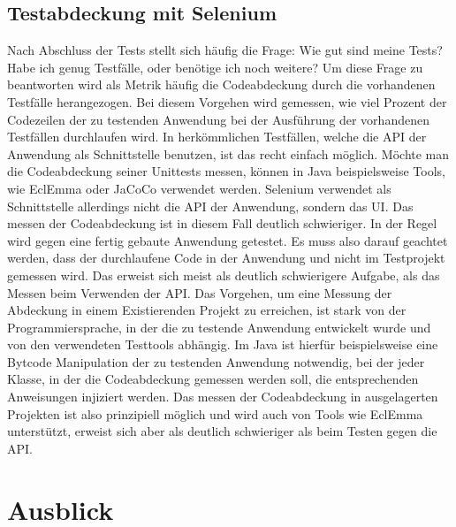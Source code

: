 \section{Testabdeckung mit Selenium}
\label{sec:testabdeckung_mit_selenium}

Nach Abschluss der Tests stellt sich häufig die Frage: Wie gut sind meine Tests? Habe ich genug Testfälle, oder benötige ich noch weitere? Um diese Frage zu beantworten wird als Metrik häufig die Codeabdeckung durch die vorhandenen Testfälle herangezogen. Bei diesem Vorgehen wird gemessen, wie viel Prozent der Codezeilen der zu testenden Anwendung bei der Ausführung der vorhandenen Testfällen durchlaufen wird.
In herkömmlichen Testfällen, welche die API der Anwendung als Schnittstelle benutzen, ist das recht einfach möglich. Möchte man die Codeabdeckung seiner Unittests messen, können in Java beispielsweise Tools, wie EclEmma oder JaCoCo verwendet werden. Selenium verwendet als Schnittstelle allerdings nicht die API der Anwendung, sondern das UI. Das messen der Codeabdeckung ist in diesem Fall deutlich schwieriger. In der Regel wird gegen eine fertig gebaute Anwendung getestet. Es muss also darauf geachtet werden, dass der durchlaufene Code in der Anwendung und nicht im Testprojekt gemessen wird.
Das erweist sich meist als deutlich schwierigere Aufgabe, als das Messen beim Verwenden der API. Das Vorgehen, um eine Messung der Abdeckung in einem Existierenden Projekt zu erreichen, ist stark von der Programmiersprache, in der die zu testende Anwendung entwickelt wurde und von den verwendeten Testtools abhängig. Im Java ist hierfür beispielsweise eine Bytcode Manipulation der zu testenden Anwendung notwendig, bei der jeder Klasse, in der die Codeabdeckung gemessen werden soll, die entsprechenden Anweisungen injiziert werden.
Das messen der Codeabdeckung in ausgelagerten Projekten ist also prinzipiell möglich und wird auch von Tools wie EclEmma unterstützt, erweist sich aber als deutlich schwieriger als beim Testen gegen die API.


\chapter{Ausblick}
\label{sec:ausblick}

